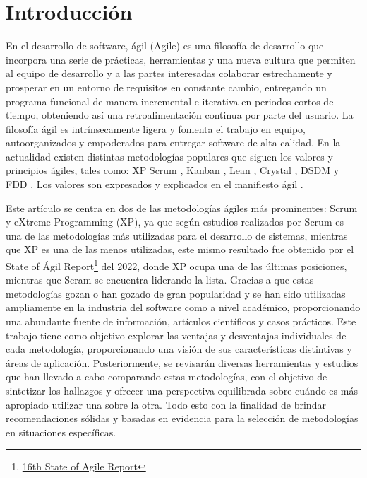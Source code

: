 \documentclass[a4paper,10pt]{article}
\begin{document}
	\section{Introducción}
	En el desarrollo de software, ágil (Agile) es una filosofía de desarrollo que incorpora una serie de prácticas, herramientas y una nueva cultura que permiten al equipo de desarrollo y a las partes interesadas colaborar estrechamente y prosperar en un entorno de requisitos en constante cambio, entregando un programa funcional de manera incremental e iterativa en periodos cortos de tiempo, obteniendo así una retroalimentación continua por parte del usuario. La filosofía ágil es intrínsecamente ligera y fomenta el trabajo en equipo, autoorganizados y empoderados para entregar software de alta calidad. En la actualidad existen distintas metodologías populares que siguen los valores y principios ágiles, tales como: XP \parencite{Beck_Andres_2005} Scrum \parencite{sutherland2014scrum}, Kanban \parencite{anderson2010kanban}, Lean \parencite{poppendieck2003lean}, Crystal \parencite{cockburn2004crystal}, DSDM \parencite{stapleton1997dynamic} y FDD \parencite{palmer2001practical}. Los valores son expresados y explicados en el manifiesto ágil \parencite{Manifesto_for_Agile_Software_Development}.
	
	Este artículo se centra en dos de las metodologías ágiles más prominentes: Scrum y eXtreme Programming (XP), ya que según estudios realizados por \textcite{fuior2019key} Scrum es una de las metodologías más utilizadas para el desarrollo de sistemas, mientras que XP es una de las menos utilizadas, este mismo resultado fue obtenido por el State of Ágil Report\footnote{\href{https://info.digital.ai/rs/981-LQX-968/images/SOA16.pdf}{16th State of Agile Report}} del 2022, donde XP ocupa una de las últimas posiciones, mientras que Scram se encuentra liderando la lista. Gracias a que estas metodologías gozan o han gozado de gran popularidad y se han sido utilizadas ampliamente en la industria del software como a nivel académico, proporcionando una abundante fuente de información, artículos científicos y casos prácticos. Este trabajo tiene como objetivo explorar las ventajas y desventajas individuales de cada metodología, proporcionando una visión de sus características distintivas y áreas de aplicación. Posteriormente, se revisarán diversas herramientas y estudios que han llevado a cabo comparando estas metodologías, con el objetivo de sintetizar los hallazgos y ofrecer una perspectiva equilibrada sobre cuándo es más apropiado utilizar una sobre la otra. Todo esto con la finalidad de brindar recomendaciones sólidas y basadas en evidencia para la selección de metodologías en situaciones específicas.
\end{document}
